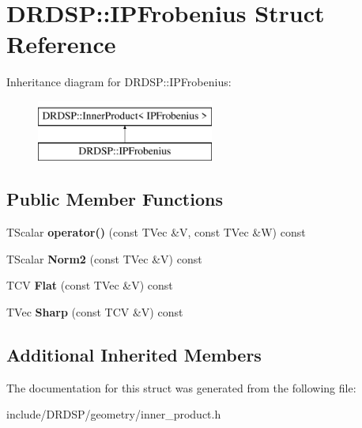 \hypertarget{struct_d_r_d_s_p_1_1_i_p_frobenius}{\section{D\-R\-D\-S\-P\-:\-:I\-P\-Frobenius Struct Reference}
\label{struct_d_r_d_s_p_1_1_i_p_frobenius}
}
Inheritance diagram for D\-R\-D\-S\-P\-:\-:I\-P\-Frobenius\-:\begin{figure}[H]
\begin{center}
\leavevmode
\includegraphics[height=2.000000cm]{struct_d_r_d_s_p_1_1_i_p_frobenius}
\end{center}
\end{figure}
\subsection*{Public Member Functions}
\begin{DoxyCompactItemize}
\item 
\hypertarget{struct_d_r_d_s_p_1_1_i_p_frobenius_a5b88ec43638c497e0199f98ab34aa10e}{T\-Scalar {\bfseries operator()} (const T\-Vec \&V, const T\-Vec \&W) const }\label{struct_d_r_d_s_p_1_1_i_p_frobenius_a5b88ec43638c497e0199f98ab34aa10e}

\item 
\hypertarget{struct_d_r_d_s_p_1_1_i_p_frobenius_a3b7f0fc2c50894fdd0df46ba3315bf0f}{T\-Scalar {\bfseries Norm2} (const T\-Vec \&V) const }\label{struct_d_r_d_s_p_1_1_i_p_frobenius_a3b7f0fc2c50894fdd0df46ba3315bf0f}

\item 
\hypertarget{struct_d_r_d_s_p_1_1_i_p_frobenius_a6fe021cb68fc41f8458731025be7f01e}{T\-C\-V {\bfseries Flat} (const T\-Vec \&V) const }\label{struct_d_r_d_s_p_1_1_i_p_frobenius_a6fe021cb68fc41f8458731025be7f01e}

\item 
\hypertarget{struct_d_r_d_s_p_1_1_i_p_frobenius_ae4baabce6d2b3657e427a44b8b32434e}{T\-Vec {\bfseries Sharp} (const T\-C\-V \&V) const }\label{struct_d_r_d_s_p_1_1_i_p_frobenius_ae4baabce6d2b3657e427a44b8b32434e}

\end{DoxyCompactItemize}
\subsection*{Additional Inherited Members}


The documentation for this struct was generated from the following file\-:\begin{DoxyCompactItemize}
\item 
include/\-D\-R\-D\-S\-P/geometry/inner\-\_\-product.\-h\end{DoxyCompactItemize}
